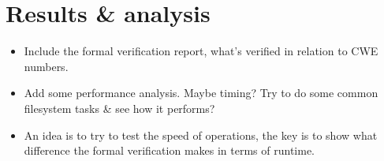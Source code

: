 \section{Results \& analysis}
\begin{itemize}
  \item Include the formal verification report, what's verified in relation to CWE numbers.
  \item Add some performance analysis. Maybe timing? Try to do some common filesystem tasks \& see how it performs?
  \item An idea is to try to test the speed of operations, the key is to show what difference the formal verification makes in terms of runtime.
\end{itemize}
